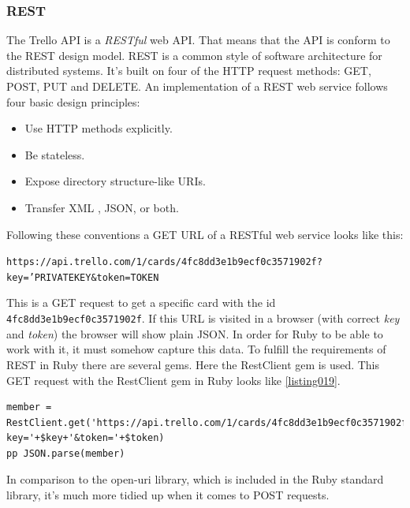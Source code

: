 \subsubsection{REST}
The Trello API is a \emph{RESTful} web API. That means that the API is conform to the REST design model. REST is a common style of software architecture for distributed systems. It's built on four of the HTTP request methods: GET, POST, PUT and DELETE. An implementation of a REST web service follows four basic design principles:
\begin{itemize}
	\item Use HTTP methods explicitly.
	\item Be stateless.
	\item Expose directory structure-like URIs.
	\item Transfer XML , JSON, or both.
\end{itemize}
\cite{rest}

Following these conventions a GET URL of a RESTful web service looks like this:
\begin{center}
\texttt{https://api.trello.com/1/cards/4fc8dd3e1b9ecf0c3571902f? key='PRIVATEKEY\&token=TOKEN}
\end{center}
This is a GET request to get a specific card with the id \texttt{4fc8dd3e1b9ecf0c3571902f}. If this URL is visited in a browser (with correct \emph{key} and \emph{token}) the browser will show plain JSON. In order for Ruby to be able to work with it, it must somehow capture this data. To fulfill the requirements of REST in Ruby there are several gems. Here the RestClient gem is used. This GET request with the RestClient gem in Ruby looks like \ref{listing019}.

\begin{lstlisting}[aboveskip=1\baselineskip, caption=GET request using RestClient., label=listing019]
member = RestClient.get('https://api.trello.com/1/cards/4fc8dd3e1b9ecf0c3571902f?key='+$key+'&token='+$token)
pp JSON.parse(member)
\end{lstlisting}

In comparison to the open-uri library, which is included in the Ruby standard library, it's much more tidied up when it comes to POST requests.

